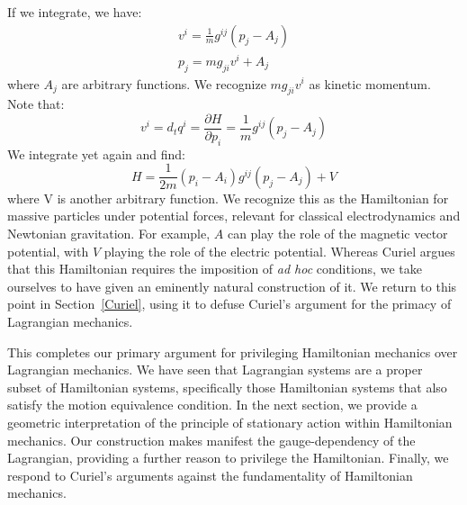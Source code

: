 \documentclass[12pt, english, twoside]{article} %
\begin{document}
If we integrate, we have:
\begin{equation} \label{linear_relationship}
\begin{aligned}
v^i = \frac{1}{m} g^{ij}(p_j - A_j) \\
p_j = m g_{ji} v^i + A_j
\end{aligned}
\end{equation}
where $A_j$ are arbitrary functions. We recognize $m g_{ji} v^i$ as kinetic momentum. Note that:
\begin{equation}
v^i = d_t q^i = \frac{\partial H }{\partial p_i} = \frac{1}{m} g^{ij}(p_j - A_j) 
\end{equation}
We integrate yet again and find:
\begin{equation} \label{massive_Hamiltonian}
H = \frac{1}{2m} (p_i - A_i) g^{ij}(p_j - A_j) + V 
\end{equation}
where V is another arbitrary function. We recognize this as the Hamiltonian for massive particles under potential forces, relevant for classical electrodynamics and Newtonian gravitation. For example, $A$ can play the role of the magnetic vector potential, with $V$ playing the role of the electric potential. Whereas Curiel \parencites*[]{Curiel} argues that this Hamiltonian requires the imposition of \textit{ad hoc} conditions, we take ourselves to have given an eminently natural construction of it. We return to this point in Section~\ref{Curiel}, using it to defuse Curiel's argument for the primacy of Lagrangian mechanics.

This completes our primary argument for privileging Hamiltonian mechanics over Lagrangian mechanics. We have seen that Lagrangian systems are a proper subset of Hamiltonian systems, specifically those Hamiltonian systems that also satisfy the motion equivalence condition. In the next section, we provide a geometric interpretation of the principle of stationary action within Hamiltonian mechanics. Our construction makes manifest the gauge-dependency of the Lagrangian, providing a further reason to privilege the Hamiltonian. Finally, we respond to Curiel's arguments against the fundamentality of Hamiltonian mechanics.
\end{document}
